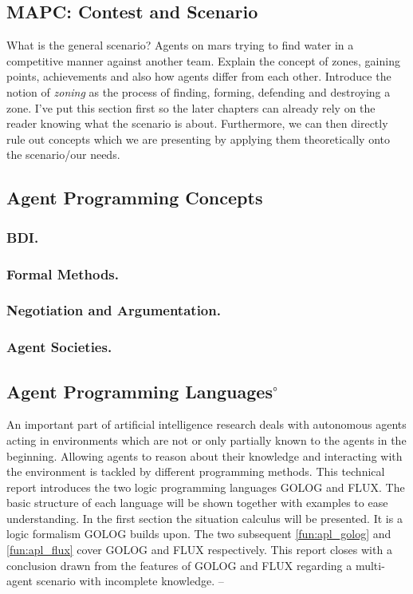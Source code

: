 \subsection{MAPC: Contest and Scenario}
What is the general scenario? Agents on mars trying to find water in a competitive manner against another team. Explain the concept of zones, gaining points, achievements and also how agents differ from each other. Introduce the notion of \emph{zoning} as the process of finding, forming, defending and destroying a zone.
I've put this section first so the later chapters can already rely on the reader knowing what the scenario is about. Furthermore, we can then directly rule out concepts which we are presenting by applying them theoretically onto the scenario/our needs.

\subsection{Agent Programming Concepts}
\subsubsection{BDI.}
\subsubsection{Formal Methods.}


\subsubsection{Negotiation and Argumentation.}


\subsubsection{Agent Societies.}
\subsection[Agent Programming Languages]{Agent Programming Languages$^\circ$}
An important part of artificial intelligence research deals with autonomous agents acting in environments which are not or only partially known to the agents in the beginning. Allowing agents to reason about their knowledge and interacting with the environment is tackled by different programming methods. This technical report introduces the two logic programming languages GOLOG and FLUX. The basic structure of each language will be shown together with examples to ease understanding. In the first section the situation calculus will be presented. It is a logic formalism GOLOG builds upon. The two subsequent \autoref{fun:apl_golog} and \autoref{fun:apl_flux} cover GOLOG and FLUX respectively. This report closes with a conclusion drawn from the features of GOLOG and FLUX regarding a multi-agent scenario with incomplete knowledge.
--

